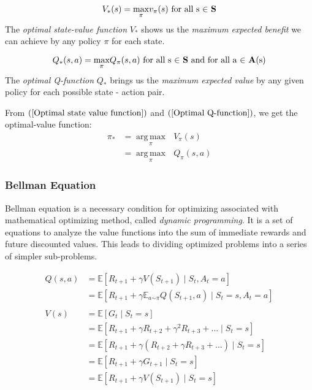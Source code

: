 \documentclass{article}
\DeclareMathOperator*{\argmax}{arg\,max}
\begin{document}
\begin{equation}
\label{Optimal state value function}
V_{*}(s) = \underset{\pi}{\max}v_{\pi}(s) \textrm{ for all s $\in$ \textbf{S}}
\end{equation}
The \textit{optimal state-value function} $V_{*}$ shows us the \textit{maximum expected benefit} we can achieve by any policy $\pi$ for each state.

\begin{equation}
\label{Optimal Q-function}
Q_{*}(s, a) = \underset{\pi}{\max}Q_{\pi}(s, a) \textrm{ for all s $\in$ \textbf{S} and for all a $\in$ \textbf{A}(s)}
\end{equation}
The \textit{optimal Q-function} $Q_{*}$ brings us the \textit{maximum expected value} by any given policy for each possible state - action pair.

From $(\ref{Optimal state value function})$ and $(\ref{Optimal Q-function})$, we get the optimal-value function:
\begin{align}
\pi_{*} &= \underset{\pi}{\argmax } \textrm{ $V_{\pi}(s)$ } \nonumber   \\
        &= \underset{\pi}{\argmax } \textrm{ $Q_{\pi}(s, a)$} \nonumber
\end{align}


\subsubsection*{Bellman Equation}
Bellman equation is a necessary condition for optimizing associated with mathematical optimizing method, called \textit{dynamic programming}. It is a set of equations to analyze the value functions into the sum of immediate rewards and future discounted values. This leads to dividing optimized problems into a series of simpler sub-problems.

\begin{align}
    Q(s, a) &= \mathbb{E}[R_{t+1} + \gamma V(S_{t+1}) \mid S_t, A_t = a ]
    \nonumber \\
            &= \mathbb{E}[R_{t+1} + \gamma \mathbb{E}_{a \stackrel{}{\sim}\pi}Q(S_{t+1}, a) \mid S_t = s, A_t = a]
    \nonumber \\
    \nonumber \\
    V(s)    &= \mathbb{E}[G_t \mid S_t = s] \nonumber \\
            &= \mathbb{E}[R_{t+1} + \gamma R_{t+2} + \gamma^2 R_{t+3} + ... \mid S_t = s] \nonumber \\
            &= \mathbb{E}[R_{t+1} + \gamma(R_{t+2} + \gamma R_{t+3} + ... ) \mid S_t = s] \nonumber \\
            &= \mathbb{E}[R_{t+1} + \gamma G_{t+1} \mid S_t = s] \nonumber\\
            &= \mathbb{E}[R_{t+1} + \gamma V(S_{t+1}) \mid S_t = s] \nonumber   
\end{align}
\end{document}
